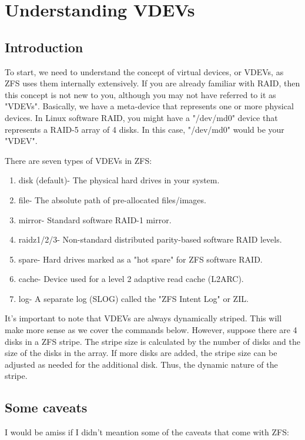 \documentclass[landscape]{book}
\begin{document}
\chapter{Understanding VDEVs}
\section{Introduction}
To start, we need to understand the concept of virtual devices, or VDEVs,
as ZFS uses them internally extensively. If you are already familiar with
RAID, then this concept is not new to you, although you may not have
referred to it as "VDEVs". Basically, we have a meta-device that represents
one or more physical devices. In Linux software RAID, you might have a
"/dev/md0" device that represents a RAID-5 array of 4 disks. In this case,
"/dev/md0" would be your "VDEV".

There are seven types of VDEVs in ZFS:

\begin{enumerate}
\item disk (default)- The physical hard drives in your system.
\item file- The absolute path of pre-allocated files/images.
\item mirror- Standard software RAID-1 mirror.
\item raidz1/2/3- Non-standard distributed parity-based software RAID levels.
\item spare- Hard drives marked as a "hot spare" for ZFS software RAID.
\item cache- Device used for a level 2 adaptive read cache (L2ARC).
\item log- A separate log (SLOG) called the "ZFS Intent Log" or ZIL.
\end{enumerate}

It's important to note that VDEVs are always dynamically striped. This will
make more sense as we cover the commands below. However, suppose there are
4 disks in a ZFS stripe. The stripe size is calculated by the number of
disks and the size of the disks in the array. If more disks are added, the
stripe size can be adjusted as needed for the additional disk. Thus, the
dynamic nature of the stripe.

\section{Some caveats}
I would be amiss if I didn't meantion some of the caveats that come with
ZFS:
\end{document}
